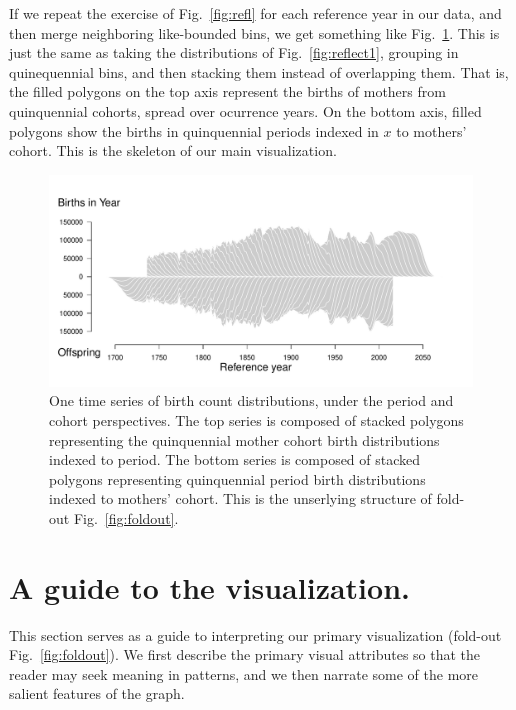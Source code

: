 \documentclass{article}
\begin{document}
If we repeat the exercise of Fig.~\ref{fig:refl} for each reference year in our data, and then merge neighboring like-bounded bins, we get something like Fig.~\ref{fig:joinbins}. This is just the same as taking the distributions of Fig.~\ref{fig:reflect1}, grouping in quinequennial bins, and then stacking them instead of overlapping them. That is, the filled polygons on the top axis represent the births of mothers from quinquennial cohorts, spread over ocurrence years. On the bottom axis, filled polygons show the births in quinquennial periods indexed in $x$ to mothers' cohort. This is the skeleton of our main visualization.

\begin{figure}[ht!]
 \centering
        \includegraphics[width=\textwidth]{Figures/JoinBins.pdf}
        \caption{One time series of birth count distributions, under the period and cohort perspectives. The top series is composed of stacked polygons representing the quinquennial mother cohort birth distributions indexed to period. The bottom series is composed of stacked polygons representing quinquennial period birth distributions indexed to mothers' cohort. This is the unserlying structure of fold-out Fig.~\ref{fig:foldout}.}
          \label{fig:joinbins}
\end{figure}

\section{A guide to the visualization.}
\label{sec:description}
This section serves as a guide to interpreting our primary visualization (fold-out Fig.~\ref{fig:foldout}). We first describe the primary visual attributes so that the reader may seek meaning in patterns, and we then narrate some of the more salient features of the graph.
\end{document}
